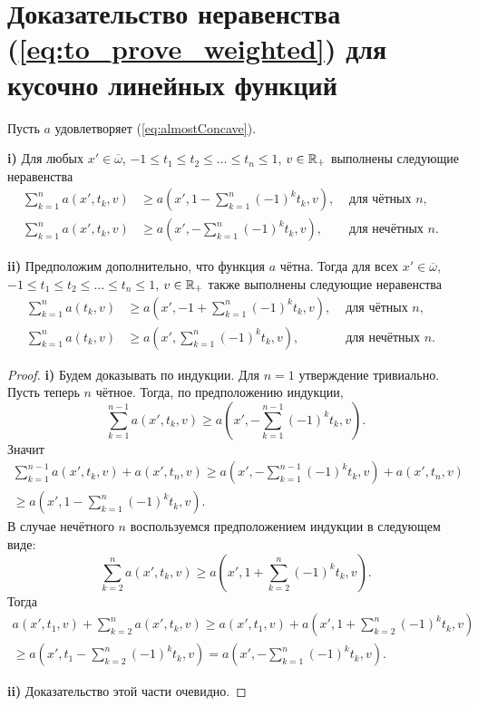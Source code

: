 \section{Доказательство неравенства (\ref{eq:to_prove_weighted}) для кусочно ли\-ней\-ных функций}

\begin{lm}
\label{lm:weight_sum}
Пусть $a$ удовлетворяет (\ref{eq:almostConcave}).

\textbf{\textup{i)}}
Для любых $x' \in \overline{\omega}$, $-1 \le t_1 \le t_2 \le \ldots \le t_n \le 1$, $v \in \mathbb R_+$ выполнены следующие неравенства
\begin{align*}
\sum_{k = 1}^n a(x', t_k, v) & \ge a( x', 1 - \sum_{k = 1}^n (-1)^k t_k, v ), & \text{ для чётных $n$}, & \\
\sum_{k = 1}^n a(x', t_k, v) & \ge a( x', - \sum_{k = 1}^n (-1)^k t_k, v ),   & \text{ для нечётных $n$}. &
\end{align*}

\textbf{\textup{ii)}}
Предположим дополнительно, что функция $a$ чётна.
Тогда для всех $x' \in \overline{\omega}$, $-1 \le t_1 \le t_2 \le \ldots \le t_n \le 1$, $v \in \mathbb R_+$ также выполнены следующие неравенства
\begin{align*}
\sum_{k = 1}^n a(t_k, v) & \ge a( x', -1 + \sum_{k = 1}^n (-1)^k t_k, v ), & \text{ для чётных $n$}, & \\
\sum_{k = 1}^n a(t_k, v) & \ge a( x', \sum_{k = 1}^n (-1)^k t_k, v ),      & \text{ для нечётных $n$}. &
\end{align*}
\end{lm}

\begin{proof}
\textbf{\textup{i)}}
Будем доказывать по индукции.
Для $n = 1$ утверждение тривиально.
Пусть теперь $n$ чётное.
Тогда, по предположению индукции,
$$
\sum_{k=1}^{n - 1} a(x', t_k, v) \ge a( x', -\sum_{k = 1}^{n - 1} (-1)^k t_k, v ).
$$
Значит
\begin{multline*}
\sum_{k = 1}^{n - 1} a( x', t_k, v ) + a( x', t_n, v )
\ge a( x', -\sum_{k = 1}^{n - 1} (-1)^k t_k, v ) + a( x', t_n, v )
\\ \ge a( x', 1 - \sum_{k = 1}^{n} (-1)^k t_k, v ).
\end{multline*}
В случае нечётного $n$ воспользуемся предположением индукции в следующем виде:
$$
\sum_{k=2}^n a(x', t_k, v) \ge a( x', 1 + \sum_{k = 2}^n (-1)^k t_k, v ).
$$
Тогда
\begin{multline*}
a( x', t_1, v ) + \sum_{k = 2}^n a( x', t_k, v )
\ge a( x', t_1, v ) + a( x', 1 + \sum_{k = 2}^{n} (-1)^k t_k, v )
\\ \ge a( x', t_1 - \sum_{k = 2}^{n} (-1)^k t_k, v ) = a( x', -\sum_{k = 1}^{n} (-1)^k t_k, v ).
\end{multline*}

\textbf{\textup{ii)}} Доказательство этой части очевидно.
\end{proof}

